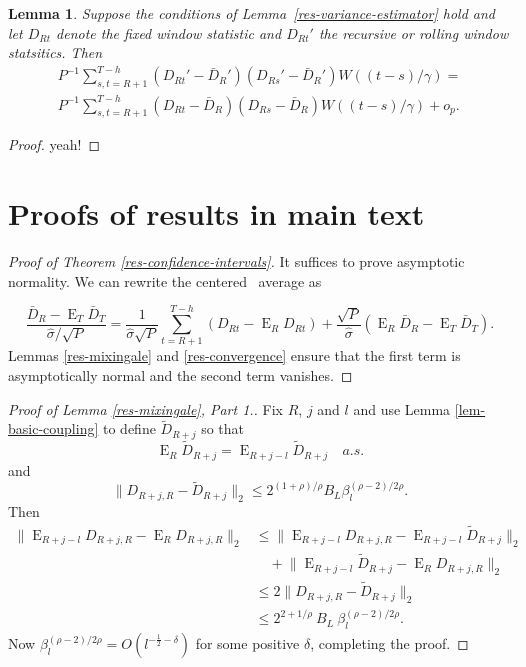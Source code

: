 \documentclass[11pt]{article}
\newtheorem{lem}[thm]{Lemma}
\DeclareMathOperator{\E}{E}
\newcommand{\oosA}{\bar{D}_{R}}
\newcommand{\oosB}{\bar{D}_{T}}
\newcommand{\oosSum}[2]{\ensuremath{\sum_{#1=R+#2}^{T-\h}}}
\newcommand{\h}{h}
\newcommand{\vWeight}{W((t-s)/\gamma)}
\newcommand{\couplingConstant}{\ensuremath{2^{(1+\rho)/\rho} B_L}}
\newcommand{\couplingBeta}[1]{\ensuremath{\beta^{(\rho-2)/2\rho}_{#1}}}
\newcommand{\couplingBound}[1]{\couplingConstant \couplingBeta{#1}}
\begin{document}
\begin{lem}
  Suppose the conditions of Lemma~\ref{res-variance-estimator} hold
  and let $D_{Rt}$ denote the fixed window statistic and $D_{Rt}'$ the
  recursive or rolling window statsitics.  Then
  \begin{multline*}P^{-1} \oosSum{s,t}{1} (D_{Rt}' - \oosA')(D_{Rs}' -
    \oosA') \vWeight = \\ P^{-1} \oosSum{s,t}{1} (D_{Rt} - \oosA)(D_{Rs}
    - \oosA) \vWeight + o_p.
  \end{multline*}
\end{lem}

\begin{proof}
  yeah!
\end{proof}

\section{Proofs of results in main text}
\begin{proof}[Proof of Theorem \ref{res-confidence-intervals}]
It suffices to prove asymptotic normality.  We can rewrite the
centered \oos\ average as

\[
\frac{\bar{D}_{R} - \E_T \bar{D}_T}{\hat\sigma / \sqrt{P}} =
\frac{1}{\hat\sigma \sqrt{P}}\oosSum{t}{1} (D_{Rt} - \E_R D_{Rt}) +
\frac{\sqrt{P}}{\hat\sigma} (\E_R\oosA - \E_T\oosB).
\]
Lemmas \ref{res-mixingale} and 
\ref{res-convergence} ensure that the first term is asymptotically
normal and the second term vanishes.
\end{proof}

\begin{proof}[Proof of Lemma \ref{res-mixingale}, Part 1.]
Fix $R$, $j$ and $l$ and use Lemma
\ref{lem-basic-coupling} to define $\tilde{D}_{R+j}$ so that
\[\E_R\tilde D_{R+j} = \E_{R+j-l} \tilde D_{R+j} \quad a.s. \]
and
\[\lVert D_{R+j,R} - \tilde D_{R+j} \rVert_2 \leq \couplingBound{l}.\]
Then
\begin{align*}
\lVert \E_{R+j-l} D_{R+j,R} - \E_R D_{R+j,R} \rVert_2 & \leq 
\lVert \E_{R+j-l} D_{R+j,R} - \E_{R+j-l} \tilde{D}_{R+j} \rVert_2 \\
&\quad + \lVert
\E_{R+j-l} \tilde{D}_{R+j} - \E_R D_{R+j,R} \rVert_2 \\
&\leq 2 \lVert D_{R+j,R} - \tilde D_{R+j} \rVert_2 \\
&\leq 2^{2 + 1/\rho}\ B_L\ \couplingBeta{l}.
\end{align*}
Now $\couplingBeta{l} = O(l^{-\frac12 - \delta})$ for some
positive $\delta$, completing the proof.
\end{proof}
\end{document}
